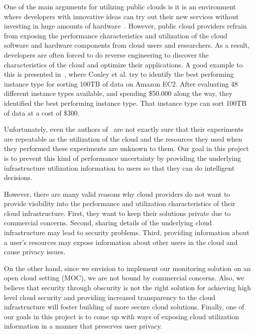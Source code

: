 
One of the main arguments for utilizing public clouds is it is an environment where developers with innovative ideas can try out their new services without investing in huge amounts of hardware~\cite{Armbrust2009}. However, public cloud providers refrain from exposing the performance characteristics and utilization of the cloud software and hardware components from cloud users and researchers. As a result, developers are often forced to do reverse engineering to discover the characteristics of the cloud and optimize their applications. A good example to this is presented in~\cite{conley2015achieving}, where Conley et al. try to identify the best performing instance type for sorting 100TB of data on Amazon EC2. After evaluating 48 different instance types available, and spending \$50.000 along the way, they identified the best performing instance type. That instance type can sort 100TB of data at a cost of \$300. 

Unfortunately, even the authors of~\cite{conley2015achieving} are not exactly sure that their experiments are repeatable as the utilization of the cloud and the resources they used when they performed these experiments are unknown to them. Our goal in this project is to prevent this kind of performance uncertainty by providing the underlying infrastructure utilization information to users so that they can do intelligent decisions.          

However, there are many valid reasons why cloud providers do not want to provide visibility into the performance and utilization characteristics of their cloud infrastructure. First, they want to keep their solutions private due to commercial concerns. Second, sharing details of the underlying cloud infrastructure may lead to security problems. Third, providing information about a user's resources may expose information about other users in the cloud and cause privacy issues. 

On the other hand, since we envision to implement our monitoring solution on an open cloud setting (MOC), we are not bound by commercial concerns. Also, we believe that security through obscurity is not the right solution for achieving high level cloud security and providing increased transparency to the cloud infrastructure will foster building of more secure cloud solutions. Finally, one of our goals in this project is to come up with ways of exposing cloud utilization information in a manner that preserves user privacy.